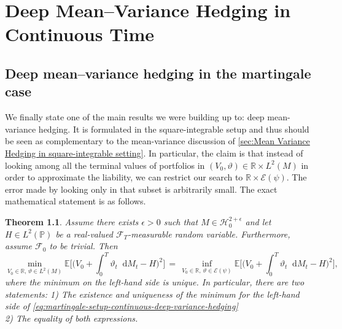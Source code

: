 \documentclass[11pt,a4paper,twoside,openany]{report}
\newcommand{\diff}{\mathop{}\!\mathrm{d}}
\theoremstyle{plain} %
\newtheorem{theorem}{Theorem}[chapter]
\theoremstyle{definition} %
\theoremstyle{remark} %
\begin{document}
\chapter{Deep Mean--Variance Hedging in Continuous Time}\label{ch:deep mean-square hedging in continuous time}


\section{Deep mean--variance hedging in the martingale case}
We finally state one of the main results we were building up to: deep mean-variance hedging. It is formulated in the square-integrable setup and thus should be seen as complementary to the mean-variance discussion of \cref{sec:Mean Variance Hedging in square-integrable setting}. In particular, the claim is that instead of looking among all the terminal values of portfolios in \((V_0,\vartheta)\in\mathbb{R}\times L^2(M)\) in order to approximate the liability, we can restrict our search to \(\mathbb{R}\times\mathcal{E}(\psi)\). The error made by looking only in that subset is arbitrarily small. The exact mathematical statement is as follows. 
\begin{theorem}\label{thm:martingale-setup-continuous-deep-variance-hedging}
Assume there exists \(\epsilon>0\) such that \(M\in\mathcal{H}_0^{2+\epsilon}\) and let \(H\in L^2(\mathbb{P})\) be a real-valued \(\mathcal{F}_{T}\)-measurable random variable. Furthermore, assume \(\mathcal{F}_0\) to be trivial.  Then
\begin{equation}\label{eq:martingale-setup-continuous-deep-variance-hedging}
    \min_{V_0\in\mathbb{R},\,\vartheta\in L^2(M)}\mathbb{E}\bigg[\bigg(V_0+\int_{0}^T\vartheta_t\diff M_t-H\bigg)^2\bigg]
    \,=\,\inf_{V_0\in\mathbb{R},\,\vartheta\in\mathcal{E}(\psi)}\mathbb{E}\bigg[\bigg(V_0+\int_{0}^T\vartheta_t\diff M_t-H\bigg)^2\bigg],
\end{equation}
where the minimum on the left-hand side is unique. 
In particular, there are two statements: 1) The existence and uniqueness of the minimum for the left-hand side of \cref{eq:martingale-setup-continuous-deep-variance-hedging}
\\2) The equality of both expressions. 
\end{theorem}
\end{document}

